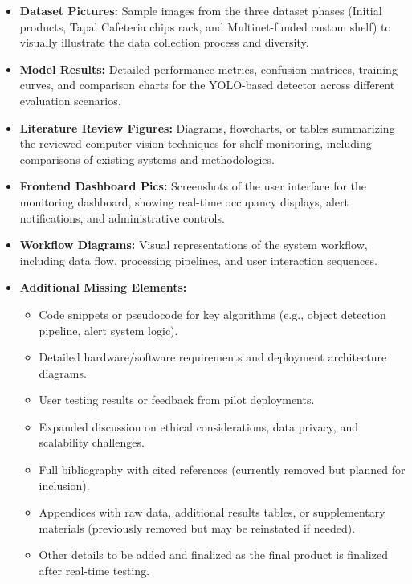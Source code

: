 \documentclass[12pt,twosided]{report}
\begin{document}
\begin{itemize}
    \item \textbf{Dataset Pictures:} Sample images from the three dataset phases (Initial products, Tapal Cafeteria chips rack, and Multinet-funded custom shelf) to visually illustrate the data collection process and diversity.
    \item \textbf{Model Results:} Detailed performance metrics, confusion matrices, training curves, and comparison charts for the YOLO-based detector across different evaluation scenarios.
    \item \textbf{Literature Review Figures:} Diagrams, flowcharts, or tables summarizing the reviewed computer vision techniques for shelf monitoring, including comparisons of existing systems and methodologies.
    \item \textbf{Frontend Dashboard Pics:} Screenshots of the user interface for the monitoring dashboard, showing real-time occupancy displays, alert notifications, and administrative controls.
    \item \textbf{Workflow Diagrams:} Visual representations of the system workflow, including data flow, processing pipelines, and user interaction sequences.
    \item \textbf{Additional Missing Elements:}
    \begin{itemize}
        \item Code snippets or pseudocode for key algorithms (e.g., object detection pipeline, alert system logic).
        \item Detailed hardware/software requirements and deployment architecture diagrams.
        \item User testing results or feedback from pilot deployments.
        \item Expanded discussion on ethical considerations, data privacy, and scalability challenges.
        \item Full bibliography with cited references (currently removed but planned for inclusion).
        \item Appendices with raw data, additional results tables, or supplementary materials (previously removed but may be reinstated if needed).
        \item Other details to be added and finalized as the final product is finalized after real-time testing.
    \end{itemize}
\end{itemize}
\end{document}
